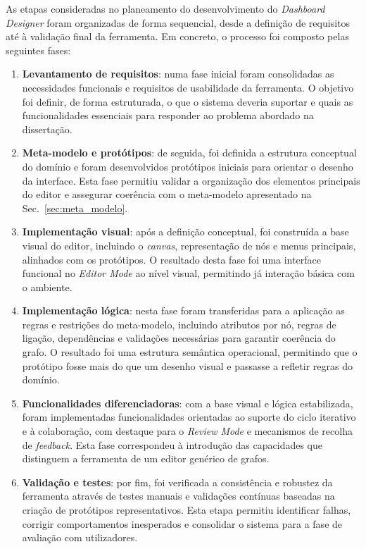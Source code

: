 As etapas consideradas no planeamento do desenvolvimento do \textit{Dashboard Designer} foram organizadas de forma sequencial, desde a definição de requisitos até à validação final da ferramenta. Em concreto, o processo foi composto pelas seguintes fases:

\begin{enumerate}
    \item \textbf{Levantamento de requisitos}: numa fase inicial foram consolidadas as necessidades funcionais e requisitos de usabilidade da ferramenta. O objetivo foi definir, de forma estruturada, o que o sistema deveria suportar e quais as funcionalidades essenciais para responder ao problema abordado na dissertação.
    
    \item \textbf{Meta-modelo e protótipos}: de seguida, foi definida a estrutura conceptual do domínio e foram desenvolvidos protótipos iniciais para orientar o desenho da interface. Esta fase permitiu validar a organização dos elementos principais do editor e assegurar coerência com o meta-modelo apresentado na Sec.~\ref{sec:meta_modelo}.
    
    \item \textbf{Implementação visual}: após a definição conceptual, foi construída a base visual do editor, incluindo o \textit{canvas}, representação de nós e menus principais, alinhados com os protótipos. O resultado desta fase foi uma interface funcional no \textit{Editor Mode} ao nível visual, permitindo já interação básica com o ambiente.
    
    \item \textbf{Implementação lógica}: nesta fase foram transferidas para a aplicação as regras e restrições do meta-modelo, incluindo atributos por nó, regras de ligação, dependências e validações necessárias para garantir coerência do grafo. O resultado foi uma estrutura semântica operacional, permitindo que o protótipo fosse mais do que um desenho visual e passasse a refletir regras do domínio.
    
    \item \textbf{Funcionalidades diferenciadoras}: com a base visual e lógica estabilizada, foram implementadas funcionalidades orientadas ao suporte do ciclo iterativo e à colaboração, com destaque para o \textit{Review Mode} e mecanismos de recolha de \textit{feedback}. Esta fase correspondeu à introdução das capacidades que distinguem a ferramenta de um editor genérico de grafos.
    
    \item \textbf{Validação e testes}: por fim, foi verificada a consistência e robustez da ferramenta através de testes manuais e validações contínuas baseadas na criação de protótipos representativos. Esta etapa permitiu identificar falhas, corrigir comportamentos inesperados e consolidar o sistema para a fase de avaliação com utilizadores.
\end{enumerate}

